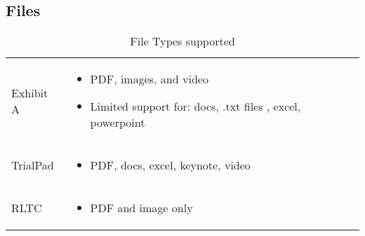 \newpage
\subsection{Files}

\begin{center}

\begin{table}[htbp]
\label{tab:FileTypesSupported}%
  \centering
  \caption{File Types supported}
    \begin{tabular}{|p{}|p{}|}
    \hline
    \rowcolor{lightgrey}\multicolumn{2}{|c|}{File types supported}\\
    \hline
	Exhibit A &
	\begin{itemize}
	  \item PDF, images, and video
	  \item Limited support for: docs, .txt files , excel, powerpoint
	\end{itemize}\\
    \hline
    TrialPad & 
    \begin{itemize}
      \item PDF, docs, excel, keynote, video
    \end{itemize} \\
    \hline
    RLTC  & 
    \begin{itemize}
      \item PDF and image only
    \end{itemize} \\
    \hline
    \end{tabular}
  
\end{table}
\end{center}


